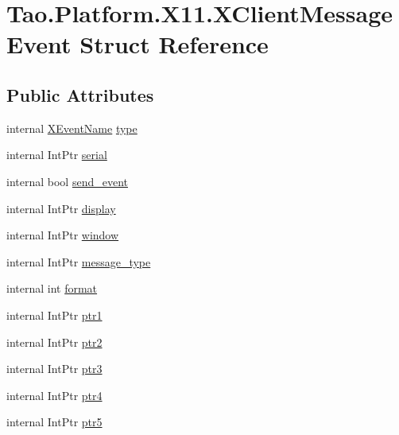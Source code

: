 \hypertarget{struct_tao_1_1_platform_1_1_x11_1_1_x_client_message_event}{
\section{Tao.Platform.X11.XClientMessageEvent Struct Reference}
\label{struct_tao_1_1_platform_1_1_x11_1_1_x_client_message_event}
}
\subsection*{Public Attributes}
\begin{DoxyCompactItemize}
\item 
internal \hyperlink{namespace_tao_1_1_platform_1_1_x11_aff81ed5b8778e1ea8e872861dff9f146}{XEventName} \hyperlink{struct_tao_1_1_platform_1_1_x11_1_1_x_client_message_event_ab08d063e2008e7c3e5e417032c3df4f2}{type}
\item 
internal IntPtr \hyperlink{struct_tao_1_1_platform_1_1_x11_1_1_x_client_message_event_a03201dcb36a4c1530ac22f8bcdd5e7f8}{serial}
\item 
internal bool \hyperlink{struct_tao_1_1_platform_1_1_x11_1_1_x_client_message_event_a2abb0394db805ab8611d5ac98078d92a}{send\_\-event}
\item 
internal IntPtr \hyperlink{struct_tao_1_1_platform_1_1_x11_1_1_x_client_message_event_aa5de46adf03bfa20499dfb28f7d791f3}{display}
\item 
internal IntPtr \hyperlink{struct_tao_1_1_platform_1_1_x11_1_1_x_client_message_event_aadfb6b7ffbc68c8a55f2caa7ce96c9ab}{window}
\item 
internal IntPtr \hyperlink{struct_tao_1_1_platform_1_1_x11_1_1_x_client_message_event_a6ff617f0a591e889d753cb4d81fb42e8}{message\_\-type}
\item 
internal int \hyperlink{struct_tao_1_1_platform_1_1_x11_1_1_x_client_message_event_ac3856d6e8477dd2e994bd45b042b5c06}{format}
\item 
internal IntPtr \hyperlink{struct_tao_1_1_platform_1_1_x11_1_1_x_client_message_event_ae9d24e76ce284024740963c3a96cd66f}{ptr1}
\item 
internal IntPtr \hyperlink{struct_tao_1_1_platform_1_1_x11_1_1_x_client_message_event_a4024fe657e59b110a42e4523d2dcf7c8}{ptr2}
\item 
internal IntPtr \hyperlink{struct_tao_1_1_platform_1_1_x11_1_1_x_client_message_event_a613e796aea564278fa8f0eaba948c735}{ptr3}
\item 
internal IntPtr \hyperlink{struct_tao_1_1_platform_1_1_x11_1_1_x_client_message_event_a87a9c205d2993cbd14b150a48116e09a}{ptr4}
\item 
internal IntPtr \hyperlink{struct_tao_1_1_platform_1_1_x11_1_1_x_client_message_event_a74fd1ad859294038afe1b823fed668d9}{ptr5}
\end{DoxyCompactItemize}


